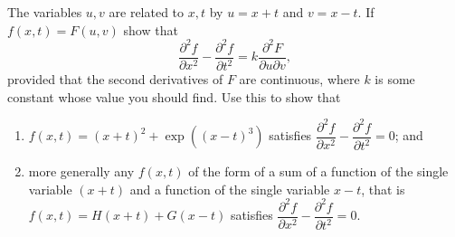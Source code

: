 \setcounter{question}{5}
\question The variables $u, v$ are related to $x, t$ by $u = x + t$ and $v = x - t$. If $f(x, t) = F(u, v)$ show that \[ \frac{\partial^2 f}{\partial x^2} - \frac{\partial^2 f}{\partial t^2} = k \frac{\partial^2 F}{\partial u \partial v}, \] provided that the second derivatives of $F$ are continuous, where $k$ is some constant whose value you should find. Use this to show that
\begin{enumerate}
    \item $f(x, t) = (x + t)^2 + \exp{((x - t)^3)}$ satisfies $\dfrac{\partial^2 f}{\partial x^2} - \dfrac{\partial^2 f}{\partial t^2} = 0$; and
    \item more generally any $f(x, t)$ of the form of a sum of a function of the single variable $(x + t)$ and a function of the single variable $x - t$, that is $f(x, t) = H(x + t) + G(x - t)$ satisfies $\dfrac{\partial^2 f}{\partial x^2} - \dfrac{\partial^2 f}{\partial t^2} = 0$.
\end{enumerate}

